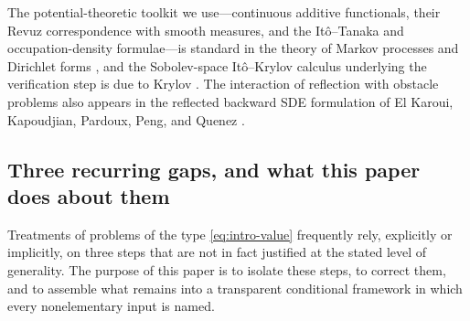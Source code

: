 \documentclass[pdflatex,sn-mathphys-num]{sn-jnl}
\theoremstyle{plain}
\theoremstyle{definition}
\begin{document}
The potential-theoretic toolkit we use---continuous additive functionals,
their Revuz correspondence with smooth measures, and the It\^o--Tanaka and
occupation-density formulae---is standard in the theory of Markov processes
and Dirichlet forms \cite{wang2026breakdown,revuz2013continuous,fukushima2011dirichlet,yu2026pattern}, and the
Sobolev-space It\^o--Krylov calculus underlying the verification step is due
to Krylov \cite{krylov1987approach}. The interaction of reflection with obstacle
problems also appears in the reflected backward SDE formulation of El Karoui,
Kapoudjian, Pardoux, Peng, and Quenez \cite{el1997reflected}.

\subsection{Three recurring gaps, and what this paper does about them}
\label{sec:intro-gaps}
Treatments of problems of the type \eqref{eq:intro-value} frequently rely,
explicitly or implicitly, on three steps that are not in fact justified at the
stated level of generality. The purpose of this paper is to isolate these
steps, to correct them, and to assemble what remains into a transparent
conditional framework in which every nonelementary input is named.
\end{document}
